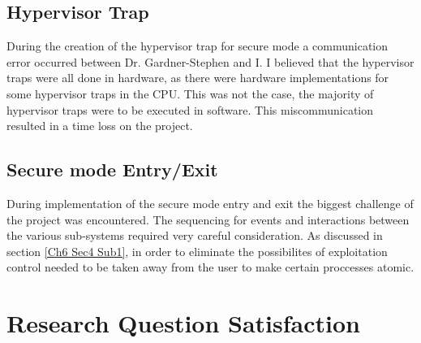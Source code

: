 \subsection{Hypervisor Trap}

\label{Ch7 Sec2 Sub2}

During the creation of the hypervisor trap for secure mode a communication error occurred between Dr. Gardner-Stephen and I. I believed that the hypervisor traps were all done in hardware, as there were hardware implementations for some hypervisor traps in the CPU. This was not the case, the majority of hypervisor traps were to be executed in software. This miscommunication resulted in a time loss on the project.

\subsection{Secure mode Entry/Exit}

\label{Ch7 Sec2 Sub3}

During implementation of the secure mode entry and exit the biggest challenge of the project was encountered. The sequencing for events and interactions between the various sub-systems required very careful consideration. As discussed in section \ref{Ch6 Sec4 Sub1}, in order to eliminate the possibilites of exploitation control needed to be taken away from the user to make certain proccesses atomic.


\section{Research Question Satisfaction}

\label{Ch7 Sec3}

